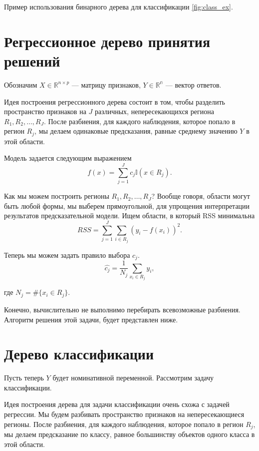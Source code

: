\documentclass[14pt, a4paper]{article}
\begin{document}
Пример использования бинарного дерева для классификации \ref{fig:class_ex}.

\section{Регрессионное дерево принятия решений}
Обозначим $X \in \mathbb{R}^{n\times p}$ --- матрицу признаков, $Y \in \mathbb{R^n}$ --- вектор ответов.

Идея построения регрессионного дерева состоит в том, чтобы разделить пространство признаков на $J$ различных, непересекающихся региона $R_1, R_2, \ldots, R_J$. После разбиения, для каждого наблюдения, которое попало в регион $R_j$, мы делаем одинаковые предсказания, равные среднему значению $Y$ в этой области.

Модель задается следующим выражением
\begin{equation}
f(x) = \sum_{j = 1}^J c_j \mathbb{I}(x \in R_j).
\end{equation}

Как мы можем построить регионы $R_1, R_2, \ldots, R_J$? Вообще говоря, области могут быть любой формы, мы выберем прямоугольной, для упрощения интерпретации результатов предсказательной модели. Ищем области, в который RSS минимальна
\begin{equation}
RSS = \sum_{j = 1}^J\sum_{i \in R_j}(y_i - f(x_i))^2.
\end{equation}


Теперь мы можем задать правило выбора $c_j$. 
\begin{equation}
\label{c_solve}
\hat{c_j} = \frac{1}{N_j} \sum_{x_i \in R_j} y_i,
\end{equation}

\noindent где $N_j = \#\{x_i \in R_j \}$.

Конечно, вычислительно не выполнимо перебирать всевозможные разбиения. Алгоритм решения этой задачи, будет представлен ниже.

\section{Дерево классификации}

Пусть теперь $Y$ будет номинативной переменной. Рассмотрим задачу классификации.

Идея построения дерева для задачи классификации очень схожа с задачей регрессии. Мы будем разбивать пространство признаков на непересекающиеся регионы. После разбиения, для каждого наблюдения, которое попало в регион $R_j$, мы делаем предсказание по классу, равное большинству объектов одного класса в этой области. 
\end{document}
